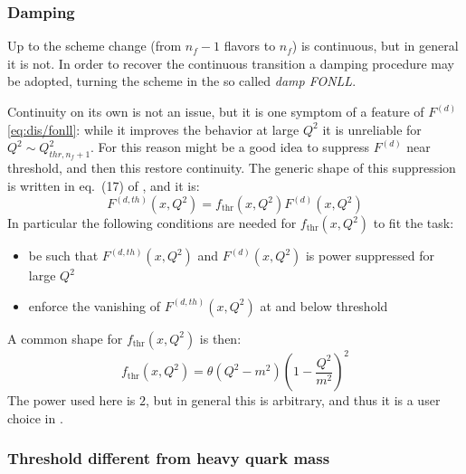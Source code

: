 \subsubsection{Damping}
\label{sec:dis/fonll-damp}

Up to \nlo the scheme change (from $n_f - 1$ flavors to $n_f$) is continuous,
but in general it is not.
%
In order to recover the continuous transition a damping procedure may be
adopted, turning the scheme in the so called \textit{damp FONLL}.

Continuity on its own is not an issue, but it is one symptom of a feature of
$F^{(d)}$ \cref{eq:dis/fonll}: while it improves the behavior at large $Q^2$ it
is unreliable for $Q^2 \sim Q_{thr,n_f+1}^2$.
%
For this reason might be a good idea to suppress $F^{(d)}$ near threshold, and
then this restore continuity.
%
The generic shape of this suppression is written in eq.~(17) of
\cite{Forte:2010ta}, and it is:
\begin{equation}
   F^{(d, th)} (x, Q^2) = f_{\textrm{thr}} (x, Q^2) F^{(d)}(x, Q^2)
\end{equation}
In particular the following conditions are needed for $f_{\text{thr}} (x, Q^2)$
to fit the task:
\begin{itemize}
  \item be such that $F^{(d, th)} (x, Q^2)$ and $F^{(d)} (x, Q^2)$ is
    power suppressed for large $Q^2$
  \item enforce the vanishing of $F^{(d, th)} (x, Q^2)$ at and below threshold
\end{itemize}

A common shape for $f_{\textrm{thr}} (x, Q^2)$ is then:
\begin{equation}
   f_{\textrm{thr}} (x, Q^2) = \theta(Q^2 - m^2) \left(1 -  \frac{Q^2}{m^2}\right)^2
\end{equation}
The power used here is $2$, but in general this is arbitrary, and thus it is a
user choice in \yadism.

\subsubsection{Threshold different from heavy quark mass}
\label{sec:dis/thr-neq-mass}

